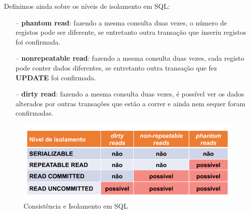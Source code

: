 \documentclass[oneside]{book}
\theoremstyle{definition}
\begin{document}
Definimos ainda sobre os níveis de isolamento em SQL:
\begin{itemize}
    \itemsep0cm
    \item[--] \textbf{phantom read}: fazendo a mesma consulta duas vezes, o número de registos pode ser diferente, se entretanto outra transação que inseriu registos foi confirmada.
    \item[--] \textbf{nonrepeatable read}: fazendo a mesma consulta duas vezes, cada registo pode conter dados diferentes, se entretanto outra transação que fez \textbf{UPDATE} foi confirmada.
    \item[--] \textbf{dirty read}: fazendo a mesma consulta duas vezes, é possível ver os dados alterados por outras transações que estão a correr e ainda nem sequer foram confirmadas.
\end{itemize}

\begin{figure}[H]
    \centering
    \includegraphics[scale = 0.4]{cap3/isolamento_transacoes.png}
    \caption{Consistência e Isolamento em SQL}
\end{figure}
\end{document}

